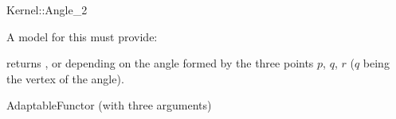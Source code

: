 \begin{ccRefFunctionObjectConcept}{Kernel::Angle_2}


A model for this must provide:


{returns ,  or  depending
on the angle formed by the three points $p$, $q$, $r$ ($q$ being the vertex of
the angle).}

\ccRefines
AdaptableFunctor (with three arguments)

\ccSeeAlso
{}  \\

\end{ccRefFunctionObjectConcept}
